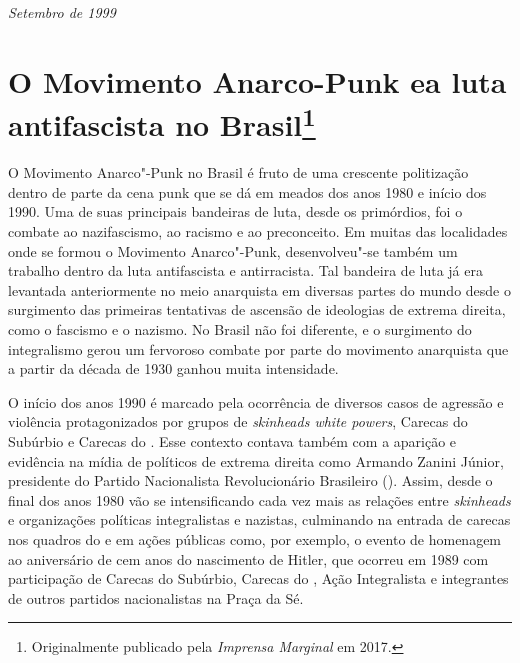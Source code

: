 
\hfill{}\emph{Setembro de 1999}


\chapter[O Movimento Anarco-Punk e a luta antifascista no Brasil]{O Movimento Anarco-Punk e\break a luta antifascista no Brasil\footnote[*]{Originalmente publicado pela \emph{Imprensa Marginal} em 2017.}}

O Movimento Anarco"-Punk no Brasil é fruto de uma crescente politização dentro de parte da cena punk que se dá em meados dos anos 1980 e início dos 1990. Uma de suas principais bandeiras de luta, desde os primórdios, foi o combate ao nazifascismo, ao racismo e ao preconceito. Em muitas das localidades onde se formou o Movimento Anarco"-Punk, desenvolveu"-se também um trabalho dentro da luta antifascista e antirracista. Tal bandeira de luta já era levantada anteriormente no meio anarquista em diversas partes do mundo desde o surgimento das primeiras tentativas de ascensão de ideologias de extrema direita, como o fascismo e o nazismo. No Brasil não foi diferente, e o surgimento do integralismo gerou um fervoroso combate por parte do movimento anarquista que a partir da década de 1930 ganhou muita intensidade.

O início dos anos 1990 é marcado pela ocorrência de diversos casos de agressão e violência protagonizados por grupos de \emph{skinheads white powers}, Carecas do Subúrbio e Carecas do . Esse contexto contava também com a aparição e evidência na mídia de políticos de extrema direita como Armando Zanini Júnior, presidente do Partido Nacionalista Revolucionário Brasileiro (). Assim, desde o final dos anos 1980 vão se intensificando cada vez mais as relações entre \emph{skinheads} e organizações políticas integralistas e nazistas, culminando na entrada de carecas nos quadros do  e em ações públicas como, por exemplo, o evento de homenagem ao aniversário de cem anos do nascimento de Hitler, que ocorreu em 1989 com participação de Carecas do Subúrbio, Carecas do , Ação Integralista e integrantes de outros partidos nacionalistas na Praça da Sé.

